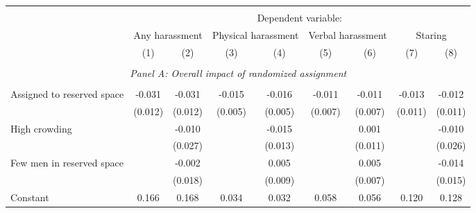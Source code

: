 \begin{tabular}{l*{8}{c}} \hline\hline \\[-1.8ex] & \multicolumn{8}{c}{Dependent variable: } \\ 
                    &\multicolumn{2}{c}{Any harassment}         &\multicolumn{2}{c}{Physical harassment}    &\multicolumn{2}{c}{Verbal harassment}      &\multicolumn{2}{c}{Staring}                \\\cmidrule(lr){2-3}\cmidrule(lr){4-5}\cmidrule(lr){6-7}\cmidrule(lr){8-9}
                    &\multicolumn{1}{c}{(1)}         &\multicolumn{1}{c}{(2)}         &\multicolumn{1}{c}{(3)}         &\multicolumn{1}{c}{(4)}         &\multicolumn{1}{c}{(5)}         &\multicolumn{1}{c}{(6)}         &\multicolumn{1}{c}{(7)}         &\multicolumn{1}{c}{(8)}         \\
 \hline \\[-1ex] \multicolumn{9}{c}{\textit{Panel A: Overall impact of randomized assignment}} \\\\[-1ex]
Assigned to reserved space&      -0.031\sym{**} &      -0.031\sym{**} &      -0.015\sym{***}&      -0.016\sym{***}&      -0.011         &      -0.011         &      -0.013         &      -0.012         \\
                    &     (0.012)         &     (0.012)         &     (0.005)         &     (0.005)         &     (0.007)         &     (0.007)         &     (0.011)         &     (0.011)         \\
[1em]
High crowding       &                     &      -0.010         &                     &      -0.015         &                     &       0.001         &                     &      -0.010         \\
                    &                     &     (0.027)         &                     &     (0.013)         &                     &     (0.011)         &                     &     (0.026)         \\
[1em]
Few men in reserved space&                     &      -0.002         &                     &       0.005         &                     &       0.005         &                     &      -0.014         \\
                    &                     &     (0.018)         &                     &     (0.009)         &                     &     (0.007)         &                     &     (0.015)         \\
[1em]
Constant            &       0.166\sym{***}&       0.168\sym{***}&       0.034\sym{***}&       0.032\sym{***}&       0.058\sym{***}&       0.056\sym{***}&       0.120\sym{***}&       0.128\sym{***}\\

\end{tabular}
